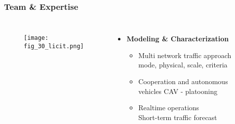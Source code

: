 \begin{frame}
\frametitle{Team \& Expertise}
    \begin{columns}
        \begin{figure}
        \centering
        \texttt{[image: fig\_30\_licit.png]}
        \end{figure}
        \begin{itemize}
        \item \textbf{Modeling \& Characterization}
            \begin{itemize}
            \item Multi network traffic approach\\
                    {\scriptsize mode, physical, scale, criteria}
            \item Cooperation and autonomous vehicles 
                    {\scriptsize CAV - platooning}
            \item Realtime operations\\ 
                    {\scriptsize Short-term traffic forecast}
            \end{itemize}
        \end{itemize}
    \end{columns}
\end{frame}